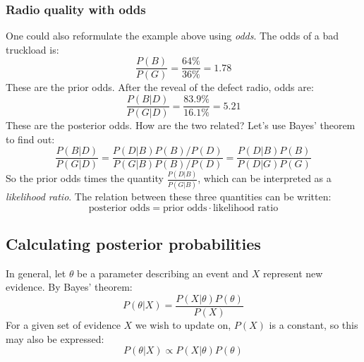\documentclass[12pt, a4paper]{article}
\begin{document}
\subsubsection{Radio quality with odds}
One could also reformulate the example above using \textit{odds}. The odds of a bad truckload is:
\begin{equation}
\frac{P(B)}{P(G)}=\frac{64\%}{36\%}=1.78
\end{equation} 
These are the prior odds. After the reveal of the defect radio, odds are:
\begin{equation}
\frac{P(B|D)}{P(G|D)}=\frac{83.9\%}{16.1\%}=5.21
\end{equation}
These are the posterior odds. How are the two related? Let's use Bayes' theorem to find out:
\begin{equation}
\frac{P(B|D)}{P(G|D)}=\frac{P(D|B)P(B)/P(D)}{P(G|B)P(B)/P(D)}=\frac{P(D|B)P(B)}{P(D|G)P(G)}
\end{equation}
So the prior odds times the quantity $\frac{P(D|B)}{P(G|B)}$, which can be interpreted as a \textit{likelihood ratio}. The relation between these three quantities can be written:
\begin{equation}
\label{bayes_odds}
\textrm{posterior odds}=\textrm{prior odds}\cdot\textrm{likelihood ratio}
\end{equation}

\subsection{Calculating posterior probabilities}
In general, let $\theta$ be a parameter describing an event and $X$ represent new evidence. By Bayes' theorem:
\begin{equation}
P(\theta|X)=\frac{P(X|\theta)P(\theta)}{P(X)}
\end{equation}
For a given set of evidence $X$ we wish to update on, $P(X)$ is a constant, so this may also be expressed:
\begin{equation}
P(\theta|X)\propto P(X|\theta)P(\theta)
\end{equation}
\end{document}
